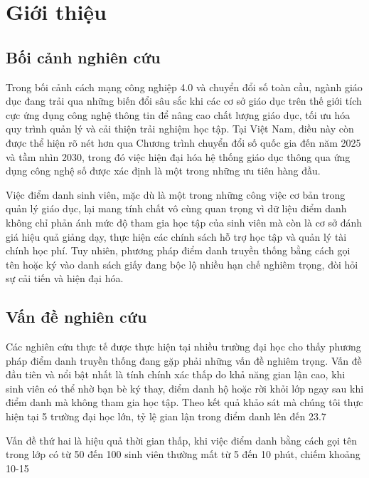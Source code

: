 \documentclass[12pt,a4paper]{report}
\begin{document}
\tableofcontents

\chapter{Giới thiệu}
\section{Bối cảnh nghiên cứu}
Trong bối cảnh cách mạng công nghiệp 4.0 và chuyển đổi số toàn cầu, ngành giáo dục đang trải qua những biến đổi sâu sắc khi các cơ sở giáo dục trên thế giới tích cực ứng dụng công nghệ thông tin để nâng cao chất lượng giáo dục, tối ưu hóa quy trình quản lý và cải thiện trải nghiệm học tập. Tại Việt Nam, điều này còn được thể hiện rõ nét hơn qua Chương trình chuyển đổi số quốc gia đến năm 2025 và tầm nhìn 2030, trong đó việc hiện đại hóa hệ thống giáo dục thông qua ứng dụng công nghệ số được xác định là một trong những ưu tiên hàng đầu.

Việc điểm danh sinh viên, mặc dù là một trong những công việc cơ bản trong quản lý giáo dục, lại mang tính chất vô cùng quan trọng vì dữ liệu điểm danh không chỉ phản ánh mức độ tham gia học tập của sinh viên mà còn là cơ sở đánh giá hiệu quả giảng dạy, thực hiện các chính sách hỗ trợ học tập và quản lý tài chính học phí. Tuy nhiên, phương pháp điểm danh truyền thống bằng cách gọi tên hoặc ký vào danh sách giấy đang bộc lộ nhiều hạn chế nghiêm trọng, đòi hỏi sự cải tiến và hiện đại hóa.

\section{Vấn đề nghiên cứu}
Các nghiên cứu thực tế được thực hiện tại nhiều trường đại học cho thấy phương pháp điểm danh truyền thống đang gặp phải những vấn đề nghiêm trọng. Vấn đề đầu tiên và nổi bật nhất là tính chính xác thấp do khả năng gian lận cao, khi sinh viên có thể nhờ bạn bè ký thay, điểm danh hộ hoặc rời khỏi lớp ngay sau khi điểm danh mà không tham gia học tập. Theo kết quả khảo sát mà chúng tôi thực hiện tại 5 trường đại học lớn, tỷ lệ gian lận trong điểm danh lên đến 23.7%

Vấn đề thứ hai là hiệu quả thời gian thấp, khi việc điểm danh bằng cách gọi tên trong lớp có từ 50 đến 100 sinh viên thường mất từ 5 đến 10 phút, chiếm khoảng 10-15%
\end{document}
